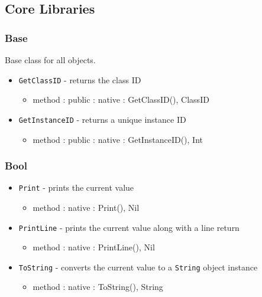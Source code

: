 \documentclass[12pt]{article}
\begin{document}
\subsection{Core Libraries}
\subsubsection{Base}
Base class for all objects.
\begin{itemize}
    \item \texttt{GetClassID} - returns the class ID
    	\begin{itemize}
	\item method : public : native : GetClassID(), ClassID
	\end{itemize}
   \item \texttt{GetInstanceID} - returns a unique instance ID
    	\begin{itemize}
	\item method : public : native : GetInstanceID(), Int
	\end{itemize}
\end{itemize}

\subsubsection{Bool}
\begin{itemize}
    \item \texttt{Print} - prints the current value
    	\begin{itemize}
	\item method : native : Print(), Nil
	\end{itemize}
    \item \texttt{PrintLine} - prints the current value along with a line return
    	\begin{itemize}
	\item method : native : PrintLine(), Nil
	\end{itemize}
    \item \texttt{ToString} - converts the current value to a \texttt{String} object instance
   	\begin{itemize}
	\item method : native : ToString(), String
	\end{itemize}
\end{itemize}
\end{document}
